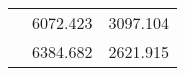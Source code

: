 \begin{table}[htbp]\centering
\def\sym#1{\ifmmode^{#1}\else\(^{#1}\)\fi}
\begin{tabular} {l*{1}{cc}}
 &  6072.423 &  3097.104\\
 &  6384.682 &  2621.915\\
\end{tabular}
\end{table}